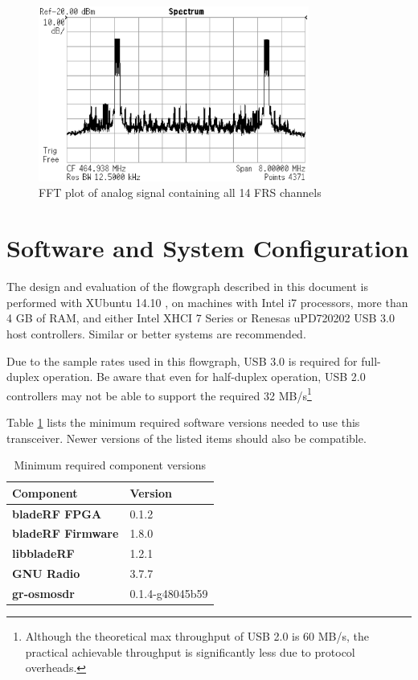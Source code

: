 \begin{figure}[h]
  \centering
  \includegraphics[width=3.5in]{images/frs/results/all_ch_enabled.eps}
  \caption{FFT plot of analog signal containing all 14 FRS channels}
  \label{fig:vsa-all}
\end{figure}

\newpage
\section{Software and System Configuration} \label{sec:sys_config}

The design and evaluation of the flowgraph described in this document is
performed with XUbuntu 14.10 \cite{XUBUNTU}, on machines with Intel i7
processors, more than 4 GB of RAM, and either Intel XHCI 7 Series or Renesas
uPD720202 USB 3.0 host controllers. Similar or better systems are recommended.

Due to the sample rates used in this flowgraph, USB 3.0 is required for
full-duplex operation. Be aware that even for half-duplex operation, USB 2.0
controllers may not be able to support the required 32 MB/s\footnote{Although
the theoretical max throughput of USB 2.0 is 60 MB/s, the practical achievable
throughput is significantly less due to protocol overheads.}

Table \ref{tab:versions} lists the minimum required software versions needed to
use this transceiver. Newer versions of the listed items should also be
compatible.

\begin{table}[h]
  \centering
  \caption{Minimum required component versions}
  \label{tab:versions}
  \footnotesize
  \begin{tabular} {|l|l|}
    \hline
    \textbf{Component}                   & \textbf{Version} \\ \hline
    \hline
    \textbf{bladeRF FPGA}               & 0.1.2             \\ \hline
    \textbf{bladeRF Firmware}           & 1.8.0             \\ \hline
    \textbf{libbladeRF}                 & 1.2.1             \\ \hline
    \textbf{GNU Radio}                  & 3.7.7             \\ \hline
    \textbf{gr-osmosdr}                 & 0.1.4-g48045b59   \\ \hline
  \end{tabular}
\end{table}

